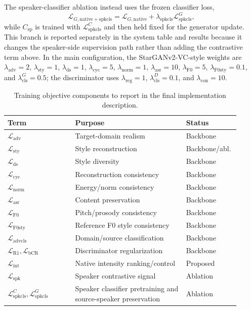 The speaker-classifier ablation instead uses the frozen classifier loss,
\begin{equation}
\mathcal{L}_{G,\mathrm{native+spkcls}} =
\mathcal{L}_{G,\mathrm{native}}
+
\lambda_{\mathrm{spkcls}}\mathcal{L}_{\mathrm{spkcls}}^{G},
\end{equation}
while $C_{\text{sp}}$ is trained with $\mathcal{L}_{\mathrm{spkcls}}^{C}$ and then held fixed for the generator update.
This branch is reported separately in the system table and results because it changes the speaker-side supervision path rather than adding the contrastive term above.
In the main configuration, the StarGANv2-VC-style weights are $\lambda_{\mathrm{adv}}=2$, $\lambda_{\mathrm{sty}}=1$, $\lambda_{\mathrm{ds}}=1$, $\lambda_{\mathrm{cyc}}=5$, $\lambda_{\mathrm{norm}}=1$, $\lambda_{\mathrm{asr}}=10$, $\lambda_{\mathrm{F0}}=5$, $\lambda_{\mathrm{F0sty}}=0.1$, and $\lambda_{\mathrm{cls}}^{G}=0.5$; the discriminator uses $\lambda_{\mathrm{reg}}=1$, $\lambda_{\mathrm{cls}}^{D}=0.1$, and $\lambda_{\mathrm{con}}=10$.

\begin{table}[t]
\caption{Training objective components to report in the final implementation description.}
\label{tab:losses}
\centering
\footnotesize
\begin{tabular}{@{}p{0.28\linewidth}p{0.46\linewidth}p{0.17\linewidth}@{}}
\toprule
Term & Purpose & Status \\
\midrule
$\mathcal{L}_{\mathrm{adv}}$ & Target-domain realism & Backbone \\
$\mathcal{L}_{\mathrm{sty}}$ & Style reconstruction & Backbone/abl. \\
$\mathcal{L}_{\mathrm{ds}}$ & Style diversity & Backbone \\
$\mathcal{L}_{\mathrm{cyc}}$ & Reconstruction consistency & Backbone \\
$\mathcal{L}_{\mathrm{norm}}$ & Energy/norm consistency & Backbone \\
$\mathcal{L}_{\mathrm{asr}}$ & Content preservation & Backbone \\
$\mathcal{L}_{\mathrm{F0}}$ & Pitch/prosody consistency & Backbone \\
$\mathcal{L}_{\mathrm{F0sty}}$ & Reference F0 style consistency & Backbone \\
$\mathcal{L}_{\mathrm{advcls}}$ & Domain/source classification & Backbone \\
$\mathcal{L}_{\mathrm{R1}},\mathcal{L}_{\mathrm{bCR}}$ & Discriminator regularization & Backbone \\
$\mathcal{L}_{\mathrm{int}}$ & Native intensity ranking/control & Proposed \\
$\mathcal{L}_{\mathrm{spk}}$ & Speaker contrastive signal & Ablation \\
$\mathcal{L}_{\mathrm{spkcls}}^{C},\mathcal{L}_{\mathrm{spkcls}}^{G}$ & Speaker classifier pretraining and source-speaker preservation & Ablation \\
\bottomrule
\end{tabular}
\end{table}

